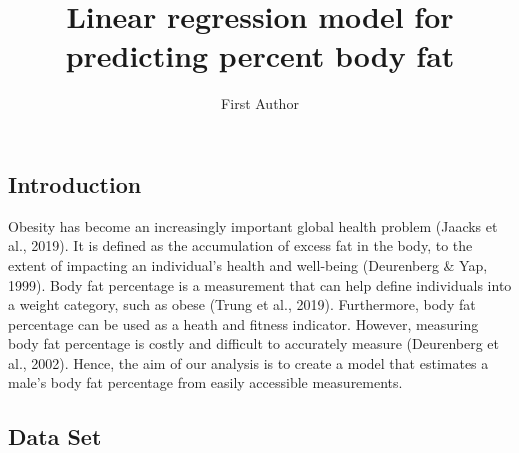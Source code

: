 \documentclass[letterpaper,9pt,twocolumn,twoside,]{pinp}
\title{Linear regression model for predicting percent body fat}
\author[]{First Author}
\begin{document}
\verticaladjustment{-2pt}

\maketitle
\thispagestyle{firststyle}



\hypertarget{introduction}{%
\subsection{Introduction}\label{introduction}}

Obesity has become an increasingly important global health problem
(Jaacks et al., 2019). It is defined as the accumulation of excess fat
in the body, to the extent of impacting an individual's health and
well-being (Deurenberg \& Yap, 1999). Body fat percentage is a
measurement that can help define individuals into a weight category,
such as obese (Trung et al., 2019). Furthermore, body fat percentage can
be used as a heath and fitness indicator. However, measuring body fat
percentage is costly and difficult to accurately measure (Deurenberg et
al., 2002). Hence, the aim of our analysis is to create a model that
estimates a male's body fat percentage from easily accessible
measurements.

\hypertarget{data-set}{%
\subsection{Data Set}\label{data-set}}
\end{document}
